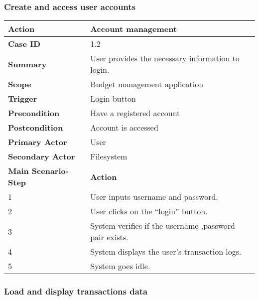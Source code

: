 \documentclass[letterpaper]{article}
\begin{document}
        		\subsubsection{Create and access user accounts}
		
        \begin{center}
        \begin{tabular}{ | m{5cm} | m{10cm}| } 
            \hline
            \textbf{Action} & Account management \\ 
            \hline
            \textbf{Case ID} & 1.2 \\ 
            \hline
            \textbf{Summary} & User provides the necessary information to login. \\
            \hline
            \textbf{Scope} & Budget management application \\ 
            \hline
            \textbf{Trigger} & Login button \\
            \hline
            \textbf{Precondition} & Have a registered account \\ 
            \hline
            \textbf{Postcondition} & Account is accessed \\ 
            \hline
            \textbf{Primary Actor} & User \\ 
            \hline
            \textbf{Secondary Actor} & Filesystem \\ 
            \hline
            \textbf{Main Scenario-Step} & \textbf{Action} \\ 
            \hline
            1 & User inputs username and password. \\ 
            \hline
            2 & User clicks on the “login” button. \\ 
            \hline
            3 & System verifies if the username ,password pair exists. \\ 
            \hline
            4 & System displays the user's transaction logs. \\ 
            \hline
            5 & System goes idle. \\ 
            \hline
        \end{tabular}
        \end{center}

		\subsubsection{Load and display transactions data}
		
\end{document}
